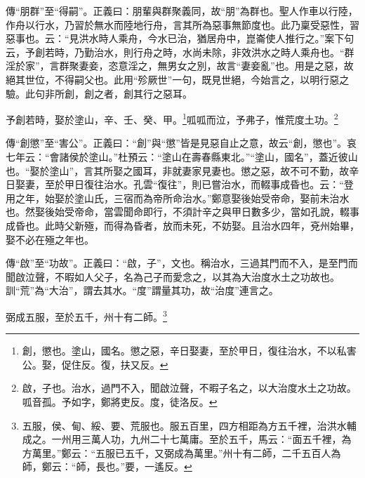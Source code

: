 {\noindent\zhuan{}\fzbyks 傳“朋群”至“得嗣”。正義曰：朋輩與群聚義同，故“朋”為群也。聖人作車以行陸，作舟以行水，乃習於無水而陸地行舟，言其所為惡事無節度也。此乃稟受惡性，習惡事也。云：“見洪水時人乘舟，今水已治，猶居舟中，崑崙使人推行之。”案下句云，予創若時，乃勤治水，則行舟之時，水尚未除，非效洪水之時人乘舟也。“群淫於家”，言群聚妻妾，恣意淫之，無男女之別，故言“妻妾亂”也。用是之惡，故絕其世位，不得嗣父也。此用“殄厥世”一句，既見世絕，今始言之，以明行惡之驗。此句非所創，創之者，創其行之惡耳。 \par}

予創若時，娶於塗山，辛、壬、癸、甲。\footnote{創，懲也。塗山，國名。懲之惡，辛日娶妻，至於甲日，復往治水，不以私害公。娶，促住反。復，扶又反。}呱呱而泣，予弗子，惟荒度土功。\footnote{啟，子也。治水，過門不入，聞啟泣聲，不暇子名之，以大治度水土之功故。呱音孤。予如字，鄭將吏反。度，徒洛反。}


{\noindent\zhuan{}\fzbyks 傳“創懲”至“害公”。正義曰：“創”與“懲”皆是見惡自止之意，故云“創，懲也”。哀七年云：“會諸侯於塗山。”杜預云：“塗山在壽春縣東北。”“塗山，國名”，蓋近彼山也。“娶於塗山”，言其所娶之國耳，非就妻家見妻也。懲之惡，故不可不勤，故辛日娶妻，至於甲日復往治水。孔雲“復往”，則已嘗治水，而輟事成昏也。云：“登用之年，始娶於塗山氏，三宿而為帝所命治水。”鄭意娶後始受帝命，娶前未治水也。然娶後始受帝命，當雲聞命即行，不須計辛之與甲日數多少，當如孔說，輟事成昏也。此時父新殛，而得為昏者，放而未死，不妨娶。且治水四年，兗州始畢，娶不必在殛之年也。 \par}

{\noindent\zhuan{}\fzbyks 傳“啟”至“功故”。正義曰：“啟，子”，文也。稱治水，三過其門而不入，是至門而聞啟泣聲，不暇如人父子，名為己子而愛念之，以其為大治度水土之功故也。訓“荒”為“大治”，謂去其水。“度”謂量其功，故“治度”連言之。 \par}

弼成五服，至於五千，州十有二師。\footnote{五服，侯、甸、綏、要、荒服也。服五百里，四方相距為方五千裡，治洪水輔成之。一州用三萬人功，九州二十七萬庸。至於五千，馬云：“面五千裡，為方萬里。”鄭云：“五服已五千，又弼成為萬里。”州十有二師，二千五百人為師，鄭云：“師，長也。”要，一遙反。}


